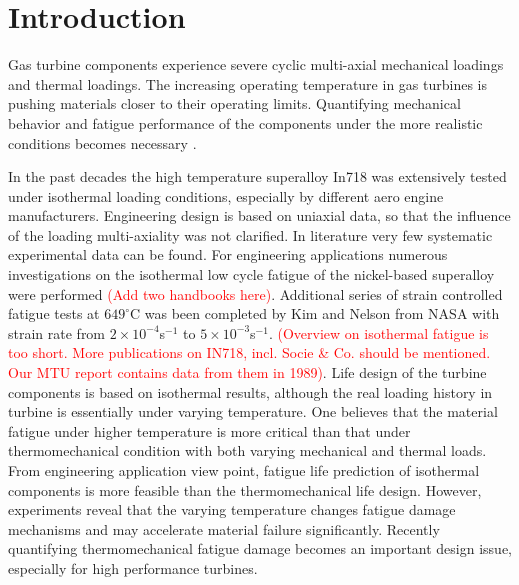 \documentclass[preprint,5p,twocolumn,11pt,sort&compress]{elsarticle}
\newcommand{\marked}[1]{\textcolor{red}{#1}}
\begin{document}
\section{Introduction}
Gas turbine components experience severe cyclic multi-axial mechanical loadings and thermal loadings. The increasing operating temperature in gas turbines is pushing materials closer to their operating limits. Quantifying mechanical behavior and fatigue performance of the components under the more realistic conditions becomes necessary \cite{Harrison1996}.

In the past decades the high temperature superalloy In718 was extensively tested under isothermal loading conditions, especially by different aero engine manufacturers. Engineering design is based on uniaxial data, so that the influence of the loading multi-axiality was not clarified. In literature very few systematic experimental data can be found. For engineering applications numerous investigations on the isothermal low cycle fatigue of the nickel-based superalloy were performed \cite{Mahobia2014, Chen2016}\marked{(Add two handbooks here)}. Additional series of strain controlled fatigue tests at $649^\circ$C was been completed by Kim \cite{kim1988elevated} and Nelson \cite{nelson1992creep} from NASA with strain rate from $2\times10^{-4}$s$^{-1}$ to $5\times10^{-3}$s$^{-1}$.
 \marked{(Overview on isothermal fatigue is too short. More publications on IN718, incl. Socie \& Co. should be mentioned. Our MTU report contains data from them in 1989)}. Life design of the turbine components is based on isothermal results, although the real loading history in turbine is essentially under varying temperature. One believes that the material fatigue under higher temperature is more critical than that under thermomechanical condition with both varying mechanical and thermal loads. From engineering application view point, fatigue life prediction of isothermal components is more feasible than the thermomechanical life design. However, experiments reveal that the varying temperature changes fatigue damage mechanisms and may accelerate material failure significantly. Recently quantifying thermomechanical fatigue damage becomes an important design issue, especially for high performance turbines.
\end{document}
